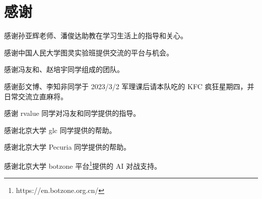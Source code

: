 \documentclass{noithesis}
\begin{document}
	\section{感谢}
	
	感谢孙亚辉老师、潘俊达助教在学习生活上的指导和关心。
	
	感谢中国人民大学图灵实验班提供交流的平台与机会。
	
	感谢冯友和、赵培宇同学组成的团队。
	
	感谢彭文博、李知非同学于 2023/3/2 军理课后请本队吃的 KFC 疯狂星期四，并日常交流立直麻将。
	
	感谢 rvalue 同学对冯友和同学提供的指导。
	
	感谢北京大学 glc 同学提供的帮助。
	
	感谢北京大学 Pecuria 同学提供的帮助。
	
	感谢北京大学 botzone 平台\footnote{https://en.botzone.org.cn/}提供的 AI 对战支持。
	
\end{document}
